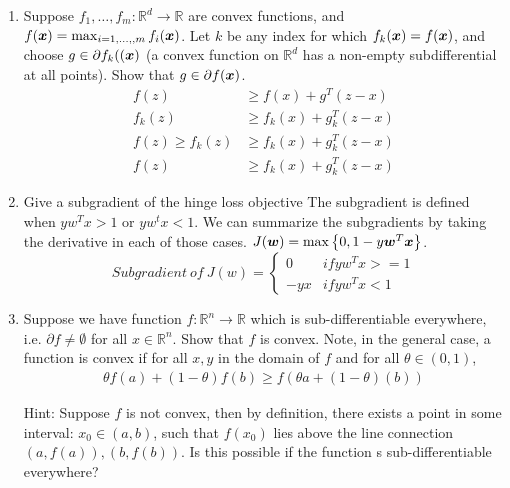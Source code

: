 \documentclass{article}
\theoremstyle{plain}
\theoremstyle{definition}
\begin{document}
\begin{enumerate}
  \setcounter{enumi}{\value{saveenum}}
\item Suppose $f_{1},\ldots,f_{m}:\mathbb{R}^{d}\to\mathbb{R}$
are convex functions, and 
$f(\boldsymbol{x})=\max_{i=1,\ldots,,m}f_{i}(\boldsymbol{x})$.
Let $k$ be any index for which $f_{k}(\boldsymbol{x})=f(\boldsymbol{x})$, and choose $g\in\partial f_{k}((\boldsymbol{x})$ (a convex function on $\mathbb{R}^{d}$ has
a non-empty subdifferential at all points). Show that $g\in\partial f(\boldsymbol{x})$.
\subitem 
\begin{equation}
\begin{split}
    f(z) &\geq f(x) + g^T(z-x) \\ 
    f_k(z) &\geq f_k(x) + g_k^T(z-x) \\
    f(z) \geq f_k(z) &\geq f_k(x) + g_k^T(z-x) \\
    f(z) &\geq  f_k(x) + g_k^T(z-x) 
\end{split}
\end{equation}

\item Give a subgradient of the hinge loss objective
The subgradient is defined when $yw^Tx>1$ or $yw^tx<1$. We can summarize the subgradients by taking the derivative in each of those cases.
$J(\boldsymbol{w})=\max\left\{ 0,1-y \boldsymbol{w}^{T} \boldsymbol{x}\right\}$.
\subitem
$$
Subgradient \ of \ J(w) = 
    \begin{cases}
    0 & if yw^Tx >= 1\\
    -yx & if yw^Tx < 1\ 
    \end{cases}
$$
 
\item Suppose we have function $f:\mathbb{R}^n\rightarrow\mathbb{R}$ which is sub-differentiable everywhere, i.e. $\partial f\neq \emptyset$ for all $x\in\mathbb{R}^n$. Show that $f$ is convex. Note, in the general case, a function is convex if for all $x,y$ in the domain of $f$ and for all $\theta \in (0,1)$,
\begin{align*}
    \theta f(a)+(1-\theta)f(b) \geq f(\theta a+(1-\theta)(b))
\end{align*}

Hint: Suppose $f$ is not convex, then by definition, there exists a point in some interval: $x_0\in (a,b)$, such that $f(x_0)$ lies above the line connection $(a,f(a)), (b,f(b))$. Is this possible if the function s sub-differentiable everywhere? 

\setcounter{saveenum}{\value{enumi}}
\end{enumerate}
\end{document}
